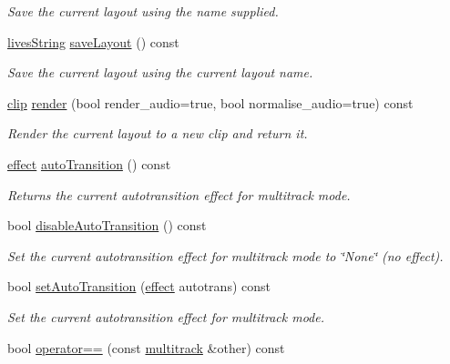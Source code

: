\begin{DoxyCompactItemize}
\begin{DoxyCompactList}\small\item\em Save the current layout using the name supplied. \end{DoxyCompactList}\item 
\hyperlink{classlives_1_1livesString}{lives\-String} \hyperlink{classlives_1_1multitrack_a051845885961bd42d7d5f36444b29053}{save\-Layout} () const 
\begin{DoxyCompactList}\small\item\em Save the current layout using the current layout name. \end{DoxyCompactList}\item 
\hyperlink{classlives_1_1clip}{clip} \hyperlink{classlives_1_1multitrack_aa766afca893af628a4e0ed93cd1a211f}{render} (bool render\-\_\-audio=true, bool normalise\-\_\-audio=true) const 
\begin{DoxyCompactList}\small\item\em Render the current layout to a new clip and return it. \end{DoxyCompactList}\item 
\hyperlink{classlives_1_1effect}{effect} \hyperlink{classlives_1_1multitrack_acc79b336b1fe1d2beffce4260b44da4f}{auto\-Transition} () const 
\begin{DoxyCompactList}\small\item\em Returns the current autotransition effect for multitrack mode. \end{DoxyCompactList}\item 
bool \hyperlink{classlives_1_1multitrack_af906b5636a475439947272e83bde0ead}{disable\-Auto\-Transition} () const 
\begin{DoxyCompactList}\small\item\em Set the current autotransition effect for multitrack mode to \char`\"{}\-None\char`\"{} (no effect). \end{DoxyCompactList}\item 
bool \hyperlink{classlives_1_1multitrack_a217f391d49113830176a3f664e2562b7}{set\-Auto\-Transition} (\hyperlink{classlives_1_1effect}{effect} autotrans) const 
\begin{DoxyCompactList}\small\item\em Set the current autotransition effect for multitrack mode. \end{DoxyCompactList}\item 
bool \hyperlink{classlives_1_1multitrack_a29420bc94d63fe785c48b841236c7b51}{operator==} (const \hyperlink{classlives_1_1multitrack}{multitrack} \&other) const 
\end{DoxyCompactItemize}
